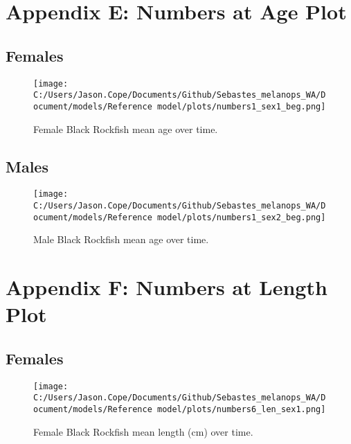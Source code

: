 \documentclass[11pt,
  english,
  letterpaper,
]{article}
\begin{document}
\clearpage

\hypertarget{app-e}{%
\section{Appendix E: Numbers at Age Plot}\label{app-e}}

\hypertarget{females}{%
\subsection{Females}\label{females}}

\begin{figure}
\centering
\texttt{[image: C:/Users/Jason.Cope/Documents/Github/Sebastes\_melanops\_WA/Document/models/Reference model/plots/numbers1\_sex1\_beg.png]}
\caption{Female Black Rockfish mean age over time.\label{fig:num_age_females}}
\end{figure}

\hypertarget{males}{%
\subsection{Males}\label{males}}

\begin{figure}
\centering
\texttt{[image: C:/Users/Jason.Cope/Documents/Github/Sebastes\_melanops\_WA/Document/models/Reference model/plots/numbers1\_sex2\_beg.png]}
\caption{Male Black Rockfish mean age over time.\label{fig:num_age_males}}
\end{figure}

\clearpage

\hypertarget{app-f}{%
\section{Appendix F: Numbers at Length Plot}\label{app-f}}

\hypertarget{females-1}{%
\subsection{Females}\label{females-1}}

\begin{figure}
\centering
\texttt{[image: C:/Users/Jason.Cope/Documents/Github/Sebastes\_melanops\_WA/Document/models/Reference model/plots/numbers6\_len\_sex1.png]}
\caption{Female Black Rockfish mean length (cm) over time.\label{fig:num_lts_females}}
\end{figure}
\end{document}
